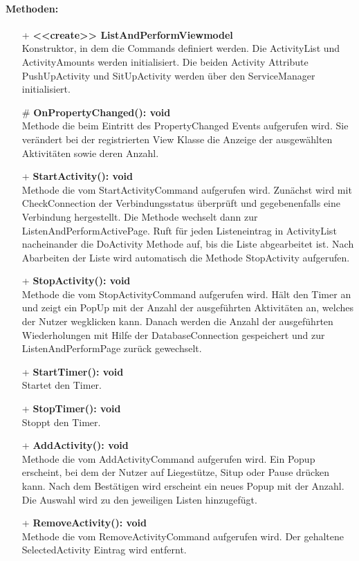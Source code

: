 \documentclass[a4paper,12pt]{article}
\begin{document}
\paragraph{Methoden:}
\begin{itemize}
	\item[+] \textbf{<<create>> ListAndPerformViewmodel} \\ Konstruktor, in dem die Commands definiert werden. Die ActivityList und ActivityAmounts werden initialisiert. Die beiden Activity Attribute PushUpActivity und SitUpActivity werden über den ServiceManager initialisiert.
	\item[\#] \textbf{OnPropertyChanged(): void} \\ Methode die beim Eintritt des PropertyChanged Events aufgerufen wird. Sie verändert bei der registrierten View Klasse die Anzeige der ausgewählten Aktivitäten sowie deren Anzahl. 
	\item[+] \textbf{StartActivity(): void} \\ Methode die vom StartActivityCommand aufgerufen wird. Zunächst wird mit CheckConnection der Verbindungsstatus überprüft und gegebenenfalls eine Verbindung hergestellt. Die Methode wechselt dann zur ListenAndPerformActivePage. Ruft für jeden Listeneintrag in ActivityList nacheinander die DoActivity Methode auf, bis die Liste abgearbeitet ist. Nach Abarbeiten der Liste wird automatisch die Methode StopActivity aufgerufen.
	\item[+] \textbf{StopActivity(): void} \\ Methode die vom StopActivityCommand aufgerufen wird. Hält den Timer an und zeigt ein PopUp mit der Anzahl der ausgeführten Aktivitäten an, welches der Nutzer wegklicken kann. Danach werden die Anzahl der ausgeführten Wiederholungen mit Hilfe der DatabaseConnection gespeichert und zur ListenAndPerformPage zurück gewechselt. 
	\item[+] \textbf{StartTimer(): void} \\ Startet den Timer. 
	\item[+] \textbf{StopTimer(): void} \\ Stoppt den Timer. 
	\item[+] \textbf{ AddActivity(): void} \\  Methode die vom AddActivityCommand aufgerufen wird. Ein Popup erscheint, bei dem der Nutzer auf Liegestütze, Situp oder Pause drücken kann. Nach dem Bestätigen wird erscheint ein neues Popup mit der Anzahl. Die Auswahl wird zu den jeweiligen Listen hinzugefügt. 
	\item[+] \textbf{RemoveActivity(): void} \\  Methode die vom RemoveActivityCommand aufgerufen wird. Der gehaltene SelectedActivity Eintrag wird entfernt. 

\end{itemize}
\end{document}
